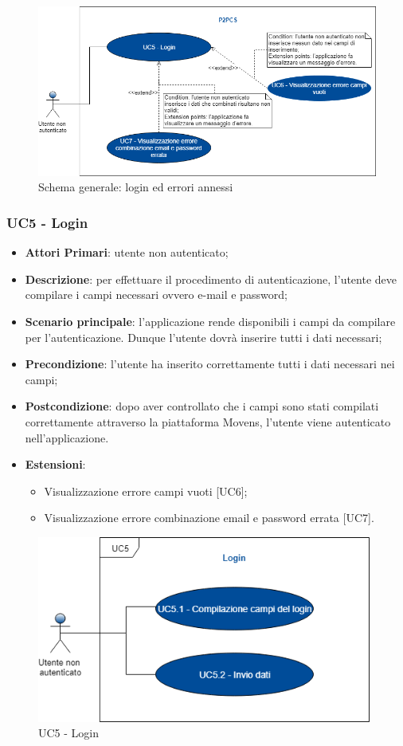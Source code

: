 \begin{figure}[h]
	\includegraphics[width=16cm]{res/images/Schemagenerale2.png}
	\centering
	\caption{Schema generale: login ed errori annessi}
\end{figure}
\newpage
\subsubsection{UC5 - Login}
\begin{itemize}
	\item \textbf{Attori Primari}: utente non autenticato;
	\item \textbf{Descrizione}: per effettuare il procedimento di autenticazione, l'utente deve compilare i campi necessari ovvero e-mail e password;
	\item \textbf{Scenario principale}: l'applicazione rende disponibili i campi da compilare per l'autenticazione. Dunque l'utente dovrà inserire tutti i dati necessari;
	\item \textbf{Precondizione}: l'utente ha inserito correttamente tutti i dati necessari nei campi;
	\item \textbf{Postcondizione}: dopo aver controllato che i campi sono stati compilati correttamente attraverso la piattaforma Movens\glo, l'utente viene autenticato nell'applicazione.
	\item \textbf{Estensioni}:
		\begin{itemize}
			\item Visualizzazione errore campi vuoti [UC6];
			\item Visualizzazione errore combinazione email e password errata [UC7].
		\end{itemize}	
\end{itemize}
\begin{figure}[h]
	\includegraphics[width=11cm]{res/images/UC5Login.png}
	\centering
	\caption{UC5 - Login}
\end{figure}
\newpage
